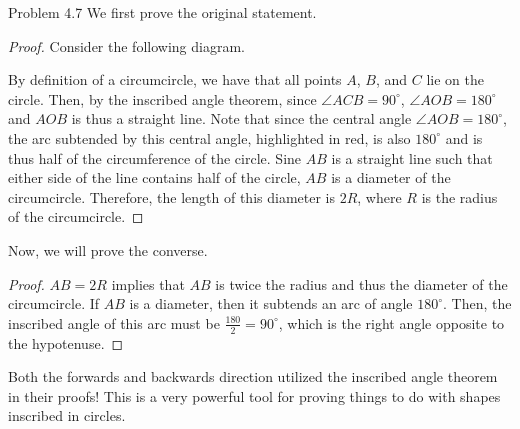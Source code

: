 \begin{sol}{Problem 4.7}
We first prove the original statement.
\begin{proof}
Consider the following diagram.


\begin{center}
\end{center}

By definition of a circumcircle, we have that all points $A$, $B$, and $C$ lie on the circle. Then, by the inscribed angle theorem, since $\angle ACB = 90^\circ$, $\angle AOB = 180^\circ$ and $AOB$ is thus a straight line. Note that since the central angle $\angle AOB = 180^\circ$, the arc subtended by this central angle, highlighted in red, is also $180^\circ$ and is thus half of the circumference of the circle. Sine $AB$ is a straight line such that either side of the line contains half of the circle, $AB$ is a diameter of the circumcircle. Therefore, the length of this diameter is $2R$, where $R$ is the radius of the circumcircle.
\end{proof}

Now, we will prove the converse.
\begin{proof}
$AB = 2R$ implies that $AB$ is twice the radius and thus the diameter of the circumcircle. If $AB$ is a diameter, then it subtends an arc of angle $180^\circ$. Then, the inscribed angle of this arc must be $\frac{180}{2} = 90^\circ$, which is the right angle opposite to the hypotenuse. 
\end{proof}

Both the forwards and backwards direction utilized the inscribed angle theorem in their proofs! This is a very powerful tool for proving things to do with shapes inscribed in circles. 
\end{sol}


